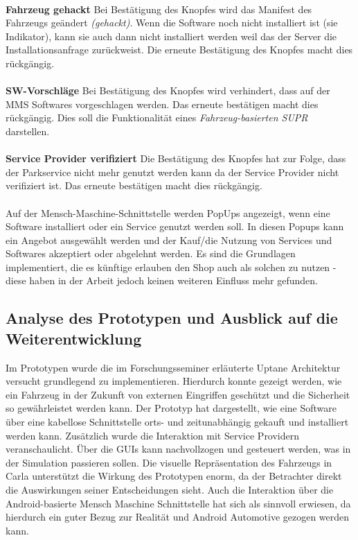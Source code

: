 \\
\textbf{Fahrzeug gehackt} Bei Bestätigung des Knopfes wird das Manifest des Fahrzeugs geändert \textit{(\glqq gehackt\grqq)}. Wenn die Software noch nicht installiert ist (sie Indikator), kann sie auch dann nicht installiert werden weil das der Server die Installationsanfrage zurückweist. Die erneute Bestätigung des Knopfes macht dies rückgängig.\\
\\
\textbf{SW-Vorschläge} Bei Bestätigung des Knopfes wird verhindert, dass auf der MMS Softwares vorgeschlagen werden. Das erneute bestätigen macht dies rückgängig. Dies soll die Funktionalität eines \textit{Fahrzeug-basierten SUPR} darstellen.\\
\\
\textbf{Service Provider verifiziert} Die Bestätigung des Knopfes hat zur Folge, dass der Parkservice nicht mehr genutzt werden kann da der Service Provider nicht verifiziert ist. Das erneute bestätigen macht dies rückgängig.\\
\\
Auf der Mensch-Maschine-Schnittstelle werden PopUps angezeigt, wenn eine Software installiert oder ein Service genutzt werden soll. In diesen Popups kann ein Angebot ausgewählt werden und der Kauf/die Nutzung von Services und Softwares akzeptiert oder abgelehnt werden. Es sind die Grundlagen implementiert, die es künftige erlauben den Shop auch als solchen zu nutzen - diese haben in der Arbeit jedoch keinen weiteren Einfluss mehr gefunden.

\subsection{Analyse des Prototypen und Ausblick auf die Weiterentwicklung}
Im Prototypen wurde die im Forschungsseminer erläuterte Uptane Architektur versucht grundlegend zu implementieren. Hierdurch konnte gezeigt werden, wie ein Fahrzeug in der Zukunft von externen Eingriffen geschützt und die Sicherheit so gewährleistet werden kann. Der Prototyp hat dargestellt, wie eine Software über eine kabellose Schnittstelle orts- und zeitunabhängig gekauft und installiert werden kann. Zusätzlich wurde die Interaktion mit Service Providern veranschaulicht. Über die GUIs kann nachvollzogen und gesteuert werden, was in der Simulation passieren sollen. Die visuelle Repräsentation des Fahrzeugs in Carla unterstützt die Wirkung des Prototypen enorm, da der Betrachter direkt die Auswirkungen seiner Entscheidungen sieht. Auch die Interaktion über die Android-basierte Mensch Maschine Schnittstelle hat sich als sinnvoll erwiesen, da hierdurch ein guter Bezug zur Realität und Android Automotive gezogen werden kann. \\

